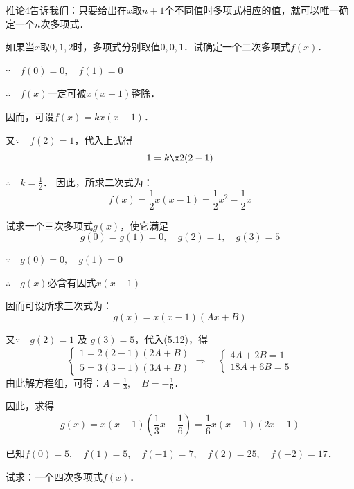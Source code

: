 推论4告诉我们：只要给出在$x$取$n+1$个不同值时多项式相应的值，就可以唯一确定一个$n$次多项式．

\begin{example}
如果当$x$取$0, 1, 2$时，多项式分别取值$0,0,1$．试确定一个二次多项式$f(x)$．
\end{example}


\begin{solution}
$\because\quad f(0)=0,\quad f(1)=0$

$\therefore\quad f(x)$一定可被$x(x-1)$整除．

因而，可设$f(x)=kx(x-1)$．

又$\because\quad f(2)=1$，代入上式得
\[1=k\x2 (2-1) \]

$\therefore\quad k=\frac{1}{2}$．
因此，所求二次式为：
\[f(x)=\frac{1}{2}x(x-1)=\frac{1}{2}x^2-\frac{1}{2}x\]
\end{solution}

\begin{example}
试求一个三次多项式$g(x)$，使它满足
\[g (0) =g (1) =0,\quad g (2) =1,\quad g (3) =5\]
\end{example}

\begin{solution}
    $\because\quad g(0)=0,\quad g(1)=0$

$\therefore\quad g(x)$必含有因式$x(x-1)$

因而可设所求三次式为：
\begin{equation}
    g (x) =x (x-1) (Ax+B)
\end{equation}

又$\because\quad g(2)=1$ 及 $g(3)=5$，代入(5.12)，得 
\[\begin{cases}
    1=2(2-1)(2A+B)\\
    5=3(3-1)(3A+B)
\end{cases}\Rightarrow\quad \begin{cases}
    4A+2B=1\\
    18A+6B=5
\end{cases}\]
由此解方程组，可得：$A=\frac{1}{3},\quad B=-\frac{1}{6}$．

因此，求得
\[g(x)=x(x-1)\left(\frac{1}{3}x-\frac{1}{6}\right)=\frac{1}{6}x(x-1)(2x-1)\]
\end{solution}

\begin{example}
已知$f(0)=5,\quad f(1)=5,\quad f(-1)=7,\quad f(2)=25,\quad f(-2)=17$．

试求：一个四次多项式$f (x)$．
\end{example}

